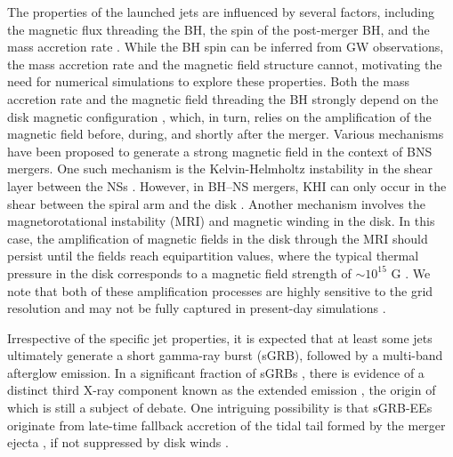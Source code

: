 \documentclass[twocolumn,dvipsnames]{aastex62}
\begin{document}
The properties of the launched jets are influenced by several factors, including the magnetic flux threading the BH, the spin of the post-merger BH, and the mass accretion rate \citep{Blandford1977,Tchekhovskoy2011,2015ASSL..414...45T}. While the BH spin can be inferred from GW observations, the mass accretion rate and the magnetic field structure cannot, motivating the need for numerical simulations to explore these properties. Both the mass accretion rate and the magnetic field threading the BH strongly depend on the disk magnetic configuration \citep{Rosswog2007}, which, in turn, relies on the amplification of the magnetic field before, during, and shortly after the merger. Various mechanisms have been proposed to generate a strong magnetic field in the context of BNS mergers. One such mechanism is the Kelvin-Helmholtz instability \citep[KHI;][]{Helmholtz1868,Thomson1871} in the shear layer between the NSs \citep{Price2006}. However, in BH--NS mergers, KHI can only occur in the shear between the spiral arm and the disk \citep{Hayashi2022a}. Another mechanism involves the magnetorotational instability (MRI) and magnetic winding in the disk. In this case, the amplification of magnetic fields in the disk through the MRI should persist until the fields reach equipartition values, where the typical thermal pressure in the disk corresponds to a magnetic field strength of $\sim 10^{15}$ G \citep{Kiuchi2015}. We note that both of these amplification processes are highly sensitive to the grid resolution and may not be fully captured in present-day simulations \citep{Kiuchi2018}.

Irrespective of the specific jet properties, it is expected that at least some jets ultimately generate a short gamma-ray burst (sGRB), followed by a multi-band afterglow emission. In a significant fraction of sGRBs \citep[$ \sim 25\% - 50\% $;][]{Norris2008,Norris2010}, there is evidence of a distinct third X-ray component known as the extended emission \citep[EE;][]{Norris2006,Perley2009}, the origin of which is still a subject of debate. One intriguing possibility is that sGRB-EEs originate from late-time fallback accretion of the tidal tail formed by the merger ejecta \citep{Rosswog2007}, if not suppressed by disk winds \citep{Fernandez2015,Fernandez2017}.
\end{document}

